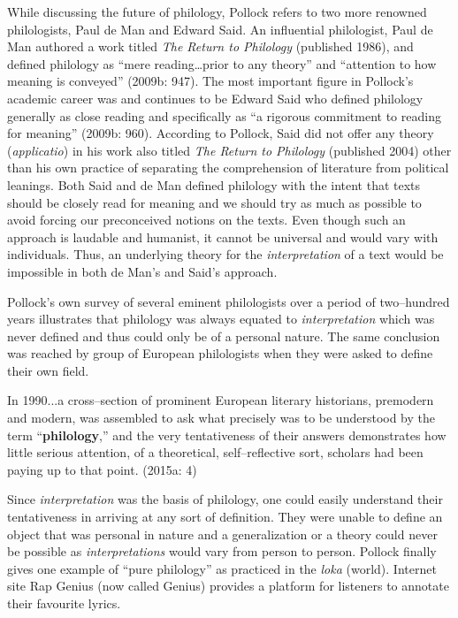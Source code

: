 While discussing the future of philology, Pollock refers to two more renowned philologists, Paul de Man and Edward Said. An influential philologist, Paul de Man authored a work titled \textit{The Return to Philology} (published 1986), and defined philology as “mere reading…prior to any theory” and “attention to how meaning is conveyed” (2009b: 947). The most important figure in Pollock’s academic career was and continues to be Edward Said who defined philology generally as close reading and specifically as “a rigorous commitment to reading for meaning” (2009b: 960). According to Pollock, Said did not offer any theory (\textit{applicatio}) in his work also titled \textit{The Return to Philology} (published 2004) other than his own practice of separating the comprehension of literature from political leanings. Both Said and de Man defined philology with the intent that texts should be closely read for meaning and we should try as much as possible to avoid forcing our preconceived notions on the texts. Even though such an approach is laudable and humanist, it cannot be universal and would vary with individuals. Thus, an underlying theory for the \textit{interpretation} of a text would be impossible in both de Man’s and Said’s approach.

Pollock’s own survey of several eminent philologists over a period of two–hundred years illustrates that philology was always equated to \textit{interpretation} which was never defined and thus could only be of a personal nature. The same conclusion was reached by group of European philologists when they were asked to define their own field.

\begin{myquote}
In 1990...a cross–section of prominent European literary historians, premodern and modern, was assembled to ask what precisely was to be understood by the term “\textbf{philology},” and the very tentativeness of their answers demonstrates how little serious attention, of a theoretical, self–reflective sort, scholars had been paying up to that point. (2015a: 4)
\end{myquote}

Since \textit{interpretation} was the basis of philology, one could easily understand their tentativeness in arriving at any sort of definition. They were unable to define an object that was personal in nature and a generalization or a theory could never be possible as \textit{interpretations} would vary from person to person. Pollock finally gives one example of “pure philology” as practiced in the \textit{loka} (world). Internet site Rap Genius (now called Genius) provides a platform for listeners to annotate their favourite lyrics.

